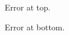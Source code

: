 \documentclass{article}
\begin{document}
\begin{figure}
\centering

\caption{Error at top.}
\end{figure}

\begin{figure}
\centering

\caption{Error at bottom.}
\end{figure}
\end{document}
